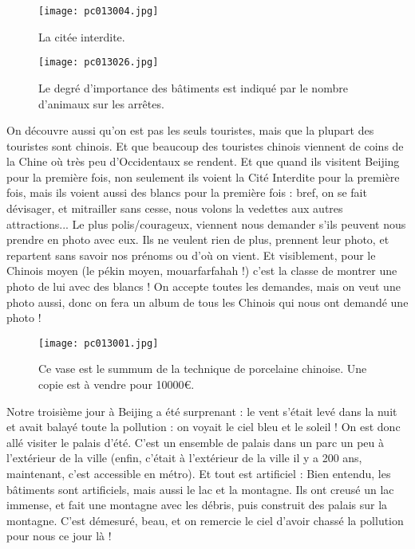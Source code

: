 \documentclass{book}
\begin{document}
\begin{figure}[H]
\centering
\texttt{[image: pc013004.jpg]}
\caption*{ La citée interdite.}
\end{figure}


\begin{figure}[H]
\centering
\texttt{[image: pc013026.jpg]}
\caption*{ Le degré d'importance des bâtiments est indiqué par le nombre d'animaux sur les arrêtes.}
\end{figure}

On découvre aussi qu'on est pas les seuls touristes, mais que la plupart des touristes sont chinois. Et que beaucoup des touristes chinois viennent de coins de la Chine où très peu d'Occidentaux se rendent. Et que quand ils visitent Beijing pour la première fois, non seulement ils voient la Cité Interdite pour la première fois, mais ils voient aussi des blancs pour la première fois : bref, on se fait dévisager, et mitrailler sans cesse, nous volons la vedettes aux autres attractions... Le plus polis/courageux, viennent nous demander s'ils peuvent nous prendre en photo avec eux. Ils ne veulent rien de plus, prennent leur photo, et repartent sans savoir nos prénoms ou d'où on vient. Et visiblement, pour le Chinois moyen (le pékin moyen, mouarfarfahah !) c'est la classe de montrer une photo de lui avec des blancs ! On accepte toutes les demandes, mais on veut une photo aussi, donc on fera un album de tous les Chinois qui nous ont demandé une photo !


\begin{figure}[H]
\centering
\texttt{[image: pc013001.jpg]}
\caption*{ Ce vase est le summum de la technique de porcelaine chinoise. Une copie est à vendre pour 10000\euro.}
\end{figure}

Notre troisième jour à Beijing a été surprenant : le vent s'était levé dans la nuit et avait balayé toute la pollution : on voyait le ciel bleu et le soleil ! On est donc allé visiter le palais d'été. C'est un ensemble de palais dans un parc un peu à l'extérieur de la ville (enfin, c'était à l'extérieur de la ville il y a 200 ans, maintenant, c'est accessible en métro). Et tout est artificiel : Bien entendu, les bâtiments sont artificiels, mais aussi le lac et la montagne. Ils ont creusé un lac immense, et fait une montagne avec les débris, puis construit des palais sur la montagne. C'est démesuré, beau, et on remercie le ciel d'avoir chassé la pollution pour nous ce jour là !
\end{document}
